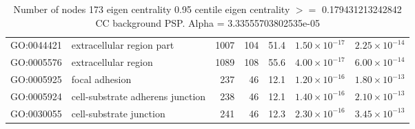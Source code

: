 \begin{table}[ht]
\begin{adjustbox}{max width=\textwidth}
\begin{tabular}{llrrrrr}
  GO:0044421 & extracellular region part & 1007 & 104 & 51.4 & $1.50 \times 10^{-17}$ & $2.25 \times 10^{-14}$ \\ 
  GO:0005576 & extracellular region & 1089 & 108 & 55.6 & $4.00 \times 10^{-17}$ & $6.00 \times 10^{-14}$ \\ 
  GO:0005925 & focal adhesion & 237 & 46 & 12.1 & $1.20 \times 10^{-16}$ & $1.80 \times 10^{-13}$ \\ 
  GO:0005924 & cell-substrate adherens junction & 238 & 46 & 12.1 & $1.40 \times 10^{-16}$ & $2.10 \times 10^{-13}$ \\ 
  GO:0030055 & cell-substrate junction & 241 & 46 & 12.3 & $2.30 \times 10^{-16}$ & $3.45 \times 10^{-13}$ \\ 
   \hline
\end{tabular}
\end{adjustbox}
\caption{Number of nodes 173 eigen centrality 0.95 centile  eigen centrality $>=$ 0.179431213242842 CC background PSP. Alpha = 3.33555703802535e-05} 
\label{tab:Number of nodes 173 eigen centrality 0.95 centile  eigen centrality $>=$ 0.179431213242842 CC background PSP. Alpha = 3.33555703802535e-05}
\end{table}


